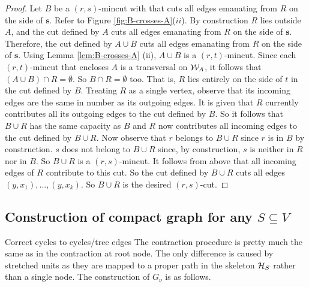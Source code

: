\begin{proof}
Let $B$ be a $(r,s)$-mincut with that cuts all edges emanating from $R$ on the side of $\mathbf{s}$. Refer to Figure \ref{fig:B-crosses-A}($ii$). By construction $R$ lies outside $A$, and the cut defined by $A$ cuts all edges emanating from $R$ on the side of $\mathbf{s}$.
 Therefore, the cut defined by $A\cup B$ cuts all edges emanating from $R$ on the side of $\mathbf{s}$. Using Lemma \ref{lem:B-crosses-A} (ii), $A\cup B$ is a $(r,t)$-mincut. Since each $(r,t)$-mincut that encloses $A$ is a transversal on ${\cal W}_A$, it follows that $(A\cup B) \cap R = \emptyset$. So $B \cap R = \emptyset$ too. That is, $R$ lies entirely on the side of $t$ in the cut defined by $B$. Treating $R$ as a single vertex, observe that its incoming edges are the same in number as its outgoing edges. It is given that $R$ currently contributes all its outgoing edges to the cut defined by $B$. So it follows that $B\cup R$ has the same capacity as $B$ and $R$ now contributes all incoming edges to the cut defined by $B \cup R$. Now observe that $r$ belongs to $B\cup R$ since $r$ is in $B$ by construction. $s$ does not belong to $B \cup R$ since, by construction, $s$ is neither in $R$ nor in $B$. So  $B\cup R$ is a $(r,s)$-mincut. It follows from above that all incoming edges of $R$ contribute to this cut. So the cut defined by $B\cup R$ cuts all edges $(y,x_1),…,(y,x_k)$. So $B\cup R$ is the desired $(r,s)$-cut.
\end{proof}





\subsection{Construction of compact graph for any $S\subseteq V$}
{\color{red} Correct cycles to cycles/tree edges}
The contraction procedure is pretty much the same as in the contraction at root node. The only difference is caused by stretched units as they are mapped to a proper path in the skeleton ${\cal H}_S$ rather than a single node. The construction of $G_\nu$ is as follows.

